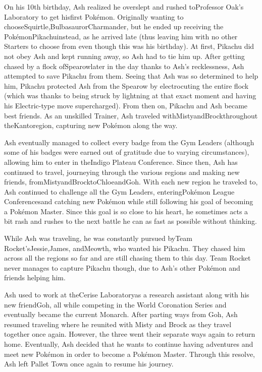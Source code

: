 \documentclass[a4paper,12pt]{article}
\begin{document}
On his 10th birthday, Ash realized he overslept and rushed toProfessor Oak's Laboratory to get hisfirst Pokémon. Originally wanting to chooseSquirtle,BulbasaurorCharmander, but he ended up receiving the PokémonPikachuinstead, as he arrived late (thus leaving him with no other Starters to choose from even though this was his birthday). At first, Pikachu did not obey Ash and kept running away, so Ash had to tie him up. After getting chased by a flock ofSpearowlater in the day thanks to Ash's recklessness, Ash attempted to save Pikachu from them. Seeing that Ash was so determined to help him, Pikachu protected Ash from the Spearow by electrocuting the entire flock (which was thanks to being struck by lightning at that exact moment and having his Electric-type move supercharged). From then on, Pikachu and Ash became best friends. As an unskilled Trainer, Ash traveled withMistyandBrockthroughout theKantoregion, capturing new Pokémon along the way.\\ \par \vspace{0.5cm}

Ash eventually managed to collect every badge from the Gym Leaders (although some of his badges were earned out of gratitude due to varying circumstances), allowing him to enter in theIndigo Plateau Conference. Since then, Ash has continued to travel, journeying through the various regions and making new friends, fromMistyandBrocktoChloeandGoh. With each new region he traveled to, Ash continued to challenge all the Gym Leaders, enteringPokémon League Conferencesand catching new Pokémon while still following his goal of becoming a Pokémon Master. Since this goal is so close to his heart, he sometimes acts a bit rash and rushes to the next battle he can as fast as possible without thinking.\\ \par \vspace{0.5cm}

While Ash was traveling, he was constantly pursued byTeam Rocket'sJessie,James, andMeowth, who wanted his Pikachu. They chased him across all the regions so far and are still chasing them to this day. Team Rocket never manages to capture Pikachu though, due to Ash's other Pokémon and friends helping him.\\ \par \vspace{0.5cm}

Ash used to work at theCerise Laboratoryas a research assistant along with his new friendGoh, all while competing in the World Coronation Series and eventually became the current Monarch. After parting ways from Goh, Ash resumed traveling where he reunited with Misty and Brock as they travel together once again. However, the three went their separate ways again to return home. Eventually, Ash decided that he wants to continue having adventures and meet new Pokémon in order to become a Pokémon Master. Through this resolve, Ash left Pallet Town once again to resume his journey.\\ \par \vspace{0.5cm}
\end{document}
